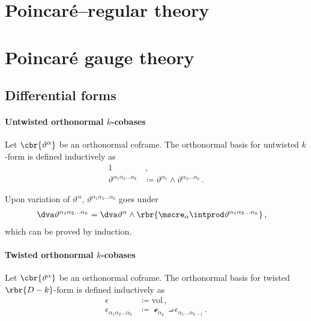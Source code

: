 \documentclass[a4paper]{article}
\begin{document}
\section{Poincaré--regular theory}




\section{Poincaré gauge theory}


\subsection{Differential forms}


\paragraph{Untwisted orthonormal $k$-cobases}
Let $\cbr{\vartheta^{\alpha}}$ be an orthonormal coframe. The orthonormal 
basis for untwisted $k$-form is defined inductively as
\begin{align}
1&\,, \\
\vartheta^{\alpha_{1}\alpha_{2}\ldots \alpha_{k}} &\coloneqq 
	\vartheta^{\alpha_{1}} \wedge \vartheta^{\alpha_{2}\ldots \alpha_{k}}\,.
\end{align}

Upon variation of $\vartheta^{\alpha}$, $\vartheta^{\alpha_{1}\alpha_{2}\ldots 
\alpha_{k}}$ goes under
\begin{align}
\dva \vartheta^{\alpha_{1}\alpha_{2}\ldots \alpha_{k}} &=
\dva \vartheta^{\alpha} \wedge \rbr{\mscre_{\alpha}\intprod 
	\vartheta^{\alpha_{1}\alpha_{2}\ldots \alpha_{k}}}\,,
\end{align}
which can be proved by induction.

\paragraph{Twisted orthonormal $k$-cobases}
Let $\cbr{\vartheta^{\alpha}}$ be an orthonormal coframe. The orthonormal 
basis for twisted $\rbr{D-k}$-form is defined inductively as
\begin{align}
\epsilon &\coloneqq \mathrm{vol}\,, \\
\epsilon_{\alpha_{1}\alpha_{2}\ldots \alpha_{k}} &\coloneqq
\mscre_{\alpha_{k}} \intprod \epsilon_{\alpha_{1}\ldots \alpha_{k-1}}\,.
\end{align}
\end{document}
